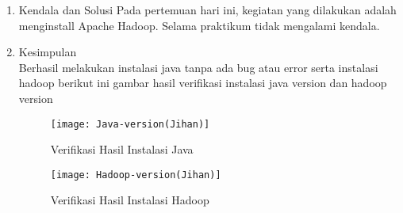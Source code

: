 \begin{enumerate}
\item Kendala dan Solusi
\newline Pada pertemuan hari ini, kegiatan yang dilakukan adalah menginstall Apache Hadoop. Selama praktikum tidak mengalami kendala.


\item Kesimpulan \\
Berhasil melakukan instalasi java tanpa ada bug atau error serta instalasi hadoop berikut ini gambar hasil verifikasi instalasi java version dan hadoop version 


\begin{figure}[!ht]
\texttt{[image: Java-version(Jihan)]}
\caption{Verifikasi Hasil Instalasi Java}
\label{gam:Java-version(Jihan)}
\end{figure} 

\begin{figure}[!ht]
\texttt{[image: Hadoop-version(Jihan)]}
\caption{Verifikasi Hasil Instalasi Hadoop}
\label{gam:Hadoop-version(Jihan)}
\end{figure} 



\end{enumerate}


